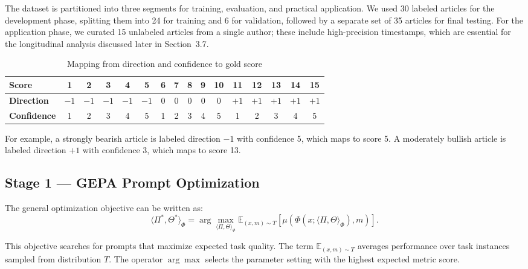 \documentclass[sigconf,screen]{acmart}
\renewcommand{\arraystretch}{1.05}
\begin{document}
The dataset is partitioned into three segments for training, evaluation, and
practical application. We used 30 labeled articles for the development phase,
splitting them into 24 for training and 6 for validation, followed by a
separate set of 35 articles for final testing. For the application phase, we
curated 15 unlabeled articles from a single author; these include
high-precision timestamps, which are essential for the longitudinal analysis
discussed later in Section~3.7.

\begin{table}[t]
  \caption{Mapping from direction and confidence to gold score}
  \label{tab:score-mapping}
  \centering
  \scriptsize
  \setlength{\tabcolsep}{2.4pt}
  \renewcommand{\arraystretch}{1.02}
  \begin{tabular}{@{}lccccccccccccccc@{}}
    \toprule
    \textbf{Score} & 1 & 2 & 3 & 4 & 5 & 6 & 7 & 8 & 9 & 10 & 11 & 12 & 13 & 14 & 15 \\
    \midrule
    \textbf{Direction} & $-1$ & $-1$ & $-1$ & $-1$ & $-1$ & 0 & 0 & 0 & 0 & 0 & $+1$ & $+1$ & $+1$ & $+1$ & $+1$ \\
    \textbf{Confidence} & 1 & 2 & 3 & 4 & 5 & 1 & 2 & 3 & 4 & 5 & 1 & 2 & 3 & 4 & 5 \\
    \bottomrule
  \end{tabular}
  \vspace{0.1em}
  \par\raggedright\footnotesize
  For example, a strongly bearish article is labeled direction $-1$ with
  confidence 5, which maps to score 5. A moderately bullish article is labeled
  direction $+1$ with confidence 3, which maps to score 13.
\end{table}

\subsection{Stage 1 --- GEPA Prompt Optimization}
The general optimization objective can be written as:
\begin{equation}
\langle \Pi^*, \Theta^* \rangle_{\Phi}
=
\arg\max_{\langle \Pi,\Theta\rangle_{\Phi}}
\mathbb{E}_{(x,m)\sim T}
\left[
\mu\left(\Phi(x;\langle \Pi,\Theta\rangle_{\Phi}),m\right)
\right].
\end{equation}

This objective searches for prompts that maximize expected task quality. The
term $\mathbb{E}_{(x,m)\sim T}$ averages performance over task instances
sampled from distribution $T$. The operator $\arg\max$ selects the parameter
setting with the highest expected metric score.
\end{document}
